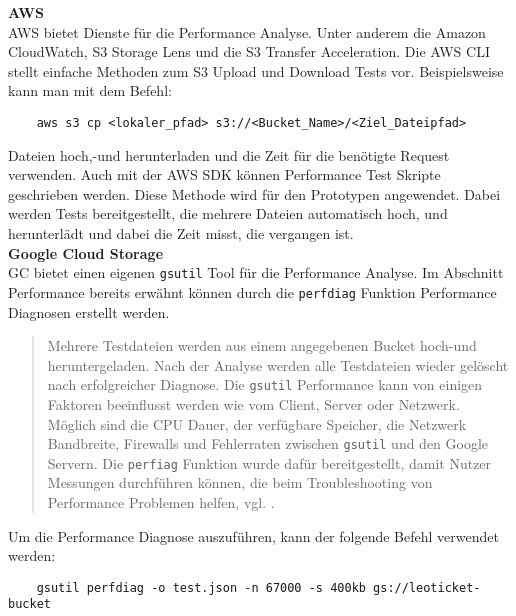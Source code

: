 \textbf{AWS}\\

AWS bietet Dienste für die Performance Analyse. Unter anderem die Amazon CloudWatch, S3 Storage Lens und die S3 Transfer Acceleration. Die AWS CLI stellt einfache Methoden zum S3 Upload und Download Tests vor. Beispielsweise kann man mit dem Befehl:


\begin{lstlisting}
	aws s3 cp <lokaler_pfad> s3://<Bucket_Name>/<Ziel_Dateipfad>
\end{lstlisting}

Dateien hoch,-und herunterladen und die Zeit für die benötigte Request verwenden. Auch mit der AWS SDK können Performance Test Skripte geschrieben werden. Diese Methode wird für den Prototypen angewendet. Dabei werden Tests bereitgestellt, die mehrere Dateien automatisch hoch, und herunterlädt und dabei die Zeit misst, die vergangen ist.\\ 

\textbf{Google Cloud Storage}\\

GC bietet einen eigenen \verb|gsutil| Tool für die Performance Analyse. Im Abschnitt Performance bereits erwähnt können durch die \verb|perfdiag| Funktion Performance Diagnosen erstellt werden. 

\begin{quote}
	Mehrere Testdateien werden aus einem angegebenen Bucket hoch-und heruntergeladen. Nach der Analyse werden alle Testdateien wieder gelöscht nach erfolgreicher Diagnose. Die \verb|gsutil| Performance kann von einigen Faktoren beeinflusst werden wie vom Client, Server oder Netzwerk. Möglich sind die CPU Dauer, der verfügbare Speicher, die Netzwerk Bandbreite, Firewalls und Fehlerraten zwischen \verb|gsutil| und den Google Servern. Die \verb|perfiag| Funktion wurde dafür bereitgestellt, damit Nutzer Messungen durchführen können, die beim Troubleshooting von Performance Problemen helfen, vgl. \cite{gc-perfdiag}.
\end{quote}

Um die Performance Diagnose auszuführen, kann der folgende Befehl verwendet werden:

\begin{lstlisting}
	gsutil perfdiag -o test.json -n 67000 -s 400kb gs://leoticket-bucket
\end{lstlisting}

